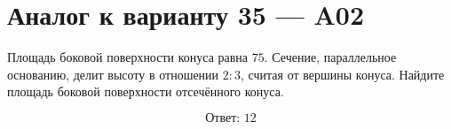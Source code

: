 \documentclass[12pt,a4paper]{article}
\begin{document}
\section*{Аналог к варианту 35 — A02}

Площадь боковой поверхности конуса равна \(75\). Сечение, параллельное основанию, делит высоту в отношении \(2:3\), считая от вершины конуса. Найдите площадь боковой поверхности отсечённого конуса.

\begin{center}
\end{center}

\[
\boxed{\text{Ответ: }12}
\]
\end{document}
